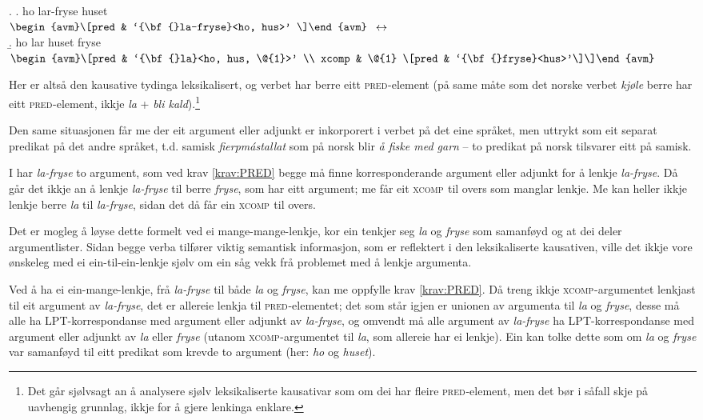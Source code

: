 \documentclass[12pt,a4paper,oneside,draft]{report}
\newcommand{\F}[2]{\textsc{#1}\ensuremath{_{#2}}}
\newcommand{\XCOMP}{\F{xcomp}{}}
\newcommand{\PRED}{\F{pred}{}}
\begin{document}
{\avmoptions{}
\ex. \a. ho lar-fryse huset \\
     $\begin{avm}\[pred & `{\bf{}la-fryse}<ho, hus>' \]\end{avm}$
     $\\\\\leftrightarrow$\\
     \b. ho lar huset fryse \\
     $\begin{avm}\[pred & `{\bf{}la}<ho, hus, \@{1}>' \\
     xcomp & \@{1} \[pred & `{\bf{}fryse}<hus>'\]\]\end{avm}$

}

Her er altså den kausative tydinga leksikalisert, og verbet har berre
eitt \PRED{}-element (på same måte som det norske verbet \emph{kjøle} berre
har eitt \PRED{}-element, ikkje \emph{la} + \emph{bli kald}).\footnote{Det går sjølvsagt an å analysere sjølv leksikaliserte
        kausativar som om dei har fleire \PRED{}-element, men det bør i
        såfall skje på uavhengig grunnlag, ikkje for å gjere lenkinga
        enklare. }

Den same situasjonen får me der eit argument eller adjunkt er
inkorporert i verbet på det eine språket, men uttrykt som eit separat
predikat på det andre språket, t.d. samisk \emph{fierpmástallat} som på
norsk blir \emph{å fiske med garn} -- to predikat på norsk tilsvarer eitt
på samisk.

I \Last har \emph{la-fryse} to argument, som ved krav \ref{krav:PRED} begge
må finne korresponderande argument eller adjunkt for å lenkje \emph{la-fryse}. 
Då går det ikkje an å lenkje \emph{la-fryse} til berre \emph{fryse},
som har eitt argument; me får eit \XCOMP{} til overs som manglar
lenkje. Me kan heller ikkje lenkje berre \emph{la} til \emph{la-fryse}, sidan
det då får ein \XCOMP{} til overs.

Det er mogleg å løyse dette formelt ved ei mange-mange-lenkje, kor ein
tenkjer seg \emph{la} og \emph{fryse} som samanføyd og at dei deler
argumentlister. Sidan begge verba tilfører viktig semantisk
informasjon, som er reflektert i den leksikaliserte kausativen, ville
det ikkje vore ønskeleg med ei ein-til-ein-lenkje sjølv om ein såg
vekk frå problemet med å lenkje argumenta.

Ved å ha ei ein-mange-lenkje, frå \emph{la-fryse} til både \emph{la} og \emph{fryse},
kan me oppfylle krav \ref{krav:PRED}. Då treng ikkje
\XCOMP{}-argumentet lenkjast til eit argument av \emph{la-fryse}, det er
allereie lenkja til \PRED{}-elementet; det som står igjen er unionen av
argumenta til \emph{la} og \emph{fryse}, desse må alle ha LPT\hyp{}korrespondanse med
argument eller adjunkt av \emph{la-fryse}, og omvendt må alle argument av \emph{la-fryse} 
ha LPT\hyp{}korrespondanse med argument eller adjunkt av \emph{la}
eller \emph{fryse} (utanom \XCOMP{}-argumentet til \emph{la}, som allereie har ei
lenkje). Ein kan tolke dette som om \emph{la} og \emph{fryse} var samanføyd til
eitt predikat som krevde to argument (her: \emph{ho} og \emph{huset}).
\end{document}

